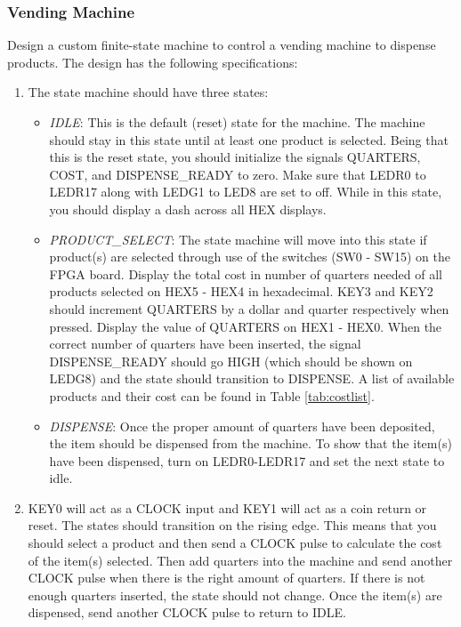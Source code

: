 \subsubsection{Vending Machine}

Design a custom finite-state machine to control a vending machine to dispense products. The design has the following specifications:

\begin{enumerate} 

	\item The state machine should have three states:

	\begin{itemize}
		\item \emph{IDLE}: This is the default (reset) state for the machine. The machine should stay in this state until at least one product is selected. Being that this is the reset state, you should initialize the signals QUARTERS, COST, and DISPENSE\_READY to zero. Make sure that LEDR0 to LEDR17 along with LEDG1 to LED8 are set to off. While in this state, you should display a dash across all HEX displays. 

		\item \emph{PRODUCT\_SELECT}: The state machine will move into this state if product(s) are selected through use of the switches (SW0 - SW15) on the FPGA board. Display the total cost in number of quarters needed of all products selected on HEX5 - HEX4 in hexadecimal.  KEY3 and KEY2 should increment QUARTERS by a dollar and quarter respectively when pressed. Display the value of QUARTERS on HEX1 - HEX0. When the correct number of quarters have been inserted, the signal DISPENSE\_READY should go HIGH (which should be shown on LEDG8) and the state should transition to DISPENSE. A list of available products and their cost can be found in Table \ref{tab:costlist}.

		\item \emph{DISPENSE}: Once the proper amount of quarters have been deposited, the item should be dispensed from the machine. To show that the item(s) have been dispensed, turn on LEDR0-LEDR17 and set the next state to idle.

	\end{itemize}
	
	\item KEY0 will act as a CLOCK input and KEY1 will act as a coin return or reset. The states should transition on the rising edge. This means that you should select a product and then send a CLOCK pulse to calculate the cost of the item(s) selected. Then add quarters into the machine and send another CLOCK pulse when there is the right amount of quarters. If there is not enough quarters inserted, the state should not change. Once the item(s) are dispensed, send another CLOCK pulse to return to IDLE.


\end{enumerate}
